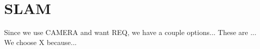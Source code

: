 \documentclass[main.tex]{subfiles}
\begin{document}
\section{SLAM}
Since we use CAMERA and want REQ, we have a couple options... These are ... We choose X because...
\end{document}
